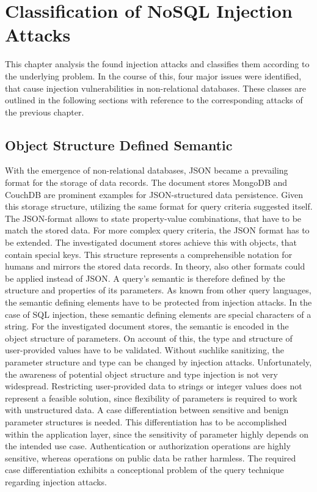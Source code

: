 \chapter{Classification of NoSQL Injection Attacks}
\label{cha:classification}
This chapter analysis the found injection attacks and classifies them according to the underlying problem. In the course of this, four major issues were identified, that cause injection vulnerabilities in non-relational databases. These classes are outlined in the following sections with reference to the corresponding attacks of the previous chapter.

\section{Object Structure Defined Semantic}
With the emergence of non-relational databases, JSON became a prevailing format for the storage of data records. The document stores MongoDB and CouchDB are prominent examples for JSON-structured data persistence. Given this storage structure, utilizing the same format for query criteria suggested itself. The JSON-format allows to state property-value combinations, that have to be match the stored data. For more complex query criteria, the JSON format has to be extended. The investigated document stores achieve this with objects, that contain special keys. This structure represents a comprehensible notation for humans and mirrors the stored data records. In theory, also other formats could be applied instead of JSON. A query's semantic is therefore defined by the structure and properties of its parameters. As known from other query languages, the semantic defining elements have to be protected from injection attacks. In the case of SQL injection, these semantic defining elements are special characters of a string. For the investigated document stores, the semantic is encoded in the object structure of parameters. On account of this, the type and structure of user-provided values have to be validated. Without suchlike sanitizing, the parameter structure and type can be changed by injection attacks. Unfortunately, the awareness of potential object structure and type injection is not very widespread. Restricting user-provided data to strings or integer values does not represent a feasible solution, since flexibility of parameters is required to work with unstructured data. A case differentiation between sensitive and benign parameter structures is needed. This differentiation has to be accomplished within the application layer, since the sensitivity of parameter highly depends on the intended use case. Authentication or authorization operations are highly sensitive, whereas operations on public data be rather harmless. The required case differentiation exhibits a conceptional problem of the query technique regarding injection attacks.\\

